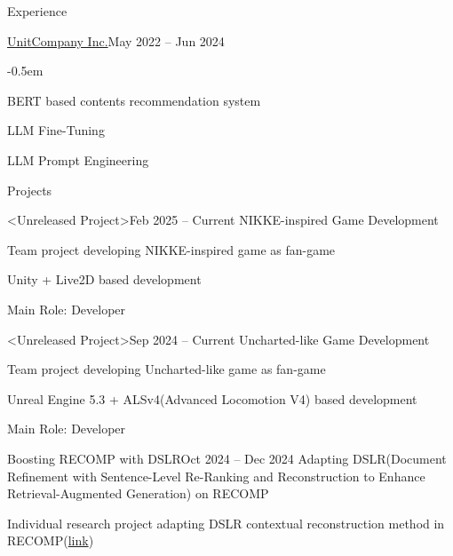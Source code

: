 \documentclass{resume}
\begin{document}
\begin{rSection}{Experience}
\begin{rSubsection}{\href{https://unitcompany.co.kr}{UnitCompany Inc.}}{May 2022 -- Jun 2024}
        \vspace{-0.5em}
        \begin{list}{--}{}
            \itemsep -0.5em

            \item BERT based contents recommendation system

            \item LLM Fine-Tuning

            \item LLM Prompt Engineering
        \end{list}
    \end{rSubsection}
\end{rSection}

\begin{rSection}{Projects}

    \begin{rSubsection}{<Unreleased Project>}{Feb 2025 -- Current}
        NIKKE-inspired Game Development

        \item Team project developing NIKKE-inspired game as fan-game

        \item Unity + Live2D based development

        \item Main Role: Developer
    \end{rSubsection}

    \begin{rSubsection}{<Unreleased Project>}{Sep 2024 -- Current}
        Uncharted-like Game Development

        \item Team project developing Uncharted-like game as fan-game

        \item Unreal Engine 5.3 + ALSv4(Advanced Locomotion V4) based development

        \item Main Role: Developer
    \end{rSubsection}

    \begin{rSubsection}{Boosting RECOMP with DSLR}{Oct 2024 -- Dec 2024}
        Adapting DSLR(Document Refinement with Sentence-Level Re-Ranking and Reconstruction to Enhance Retrieval-Augmented Generation) on RECOMP

        \item Individual research project adapting DSLR contextual reconstruction method in RECOMP(\href{https://github.com/minsusun/boosting-recomp-with-dslr}{link})


\end{rSubsection}
\end{rSection}
\end{document}

